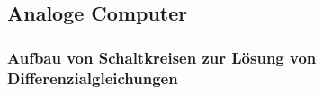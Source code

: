 \subsection{Analoge Computer}





\subsubsection{Aufbau von Schaltkreisen zur Lösung von Differenzialgleichungen}
